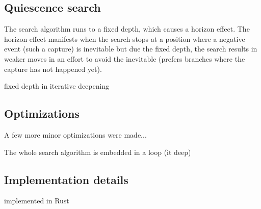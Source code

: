 \subsection{Quiescence search}

The search algorithm runs to a fixed depth, which causes a horizon effect. The horizon effect manifests when the search stops at a position where a negative event (such a capture) is inevitable but due the fixed depth, the search results in weaker moves in an effort to avoid the inevitable (prefers branches where the capture has not happened yet).



fixed depth in iterative deepening

\subsection{Optimizations}

A few more minor optimizations were made...

The whole search algorithm is embedded in a loop (it deep)




\subsection{Implementation details}

implemented in Rust
